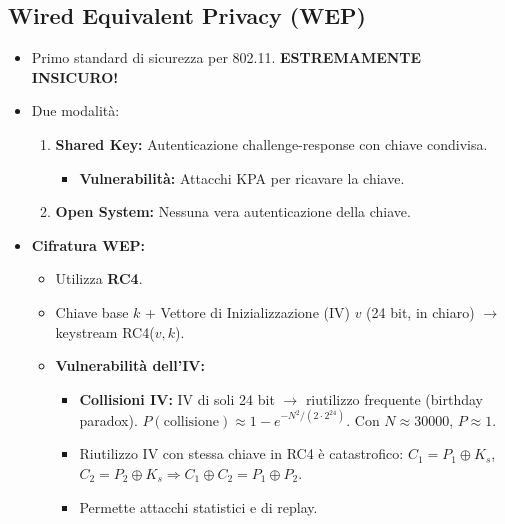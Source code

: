 \documentclass{article}
\begin{document}
\subsection{Wired Equivalent Privacy (WEP)}
\begin{itemize}
    \item Primo standard di sicurezza per 802.11. \textbf{ESTREMAMENTE INSICURO!}
    \item Due modalità:
    \begin{enumerate}
        \item \textbf{Shared Key:} Autenticazione challenge-response con chiave condivisa.
        \begin{itemize}
            \item \textbf{Vulnerabilità:} Attacchi KPA per ricavare la chiave.
        \end{itemize}
        \item \textbf{Open System:} Nessuna vera autenticazione della chiave.
    \end{enumerate}
    \item \textbf{Cifratura WEP:}
    \begin{itemize}
        \item Utilizza \textbf{RC4}.
        \item Chiave base $k$ + Vettore di Inizializzazione (IV) $v$ (24 bit, in chiaro) $\rightarrow$ keystream RC4($v,k$).
        \item \textbf{Vulnerabilità dell'IV:}
        \begin{itemize}
            \item \textbf{Collisioni IV:} IV di soli 24 bit $\rightarrow$ riutilizzo frequente (birthday paradox).
            $P(\text{collisione}) \approx 1 - e^{-N^2 / (2 \cdot 2^{24})}$. Con $N \approx 30000$, $P \approx 1$.
            \item Riutilizzo IV con stessa chiave in RC4 è catastrofico: $C_1 = P_1 \oplus K_s$, $C_2 = P_2 \oplus K_s \Rightarrow C_1 \oplus C_2 = P_1 \oplus P_2$.
            \item Permette attacchi statistici e di replay.
        \end{itemize}
    \end{itemize}
\end{itemize}
\end{document}
